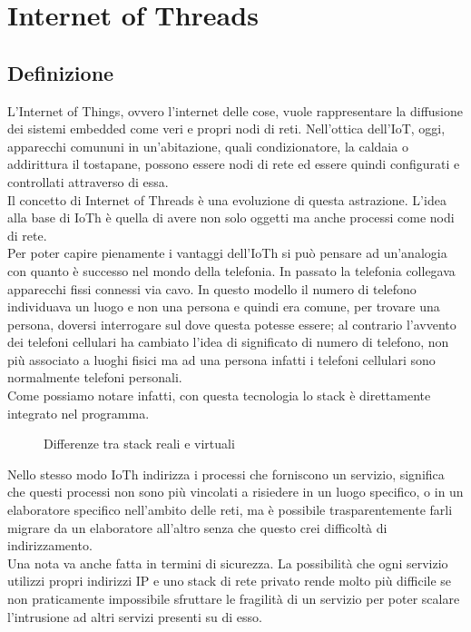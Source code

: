 \chapter{Internet of Threads}                %
\lhead[\fancyplain{}{\bfseries\thepage}]{\fancyplain{}{\bfseries\rightmark}}
\section{Definizione}                 %
L'Internet of Things, ovvero l'internet delle cose, vuole rappresentare la diffusione dei sistemi embedded come veri e propri nodi di reti. Nell'ottica dell'IoT, oggi, apparecchi comununi in un'abitazione, quali condizionatore, la caldaia o addirittura il tostapane, possono essere nodi di rete ed essere quindi configurati e controllati attraverso di essa.\\
Il concetto di Internet of Threads \`e una evoluzione di questa astrazione. L'idea alla base di IoTh \`e quella di avere non solo oggetti ma anche processi come nodi di rete.\\
Per poter capire pienamente i vantaggi dell'IoTh si pu\`o pensare ad un'analogia con quanto \`e successo nel mondo della telefonia. In passato la telefonia collegava apparecchi fissi connessi via cavo. In questo modello il numero di telefono individuava un luogo e non una persona e quindi era comune, per trovare una persona, doversi interrogare sul dove questa potesse essere; al contrario l'avvento dei telefoni cellulari ha cambiato l'idea di significato di numero di telefono, non pi\`u associato a luoghi fisici ma ad una persona infatti i telefoni cellulari sono normalmente telefoni personali\cite{K1,K2}.\\
Come possiamo notare infatti, con questa tecnologia lo stack \`e direttamente integrato nel programma.
\begin{figure}[h]
     \begin{center}%
%
    \end{center}
    \caption{%
        Differenze tra stack reali e virtuali
     }%
\end{figure}%
Nello stesso modo IoTh indirizza i processi che forniscono un servizio, significa che questi processi non sono pi\`u vincolati a risiedere in un luogo specifico, o in un elaboratore specifico nell'ambito delle reti, ma \`e possibile trasparentemente farli migrare da un elaboratore all'altro senza che questo crei difficolt\`a di indirizzamento.\\
Una nota va anche fatta in termini di sicurezza. La possibilit\`a che ogni servizio utilizzi propri indirizzi IP e uno stack di rete privato rende molto pi\`u difficile se non praticamente impossibile sfruttare le fragilit\`a di un servizio per poter scalare l'intrusione ad altri servizi presenti su di esso.

